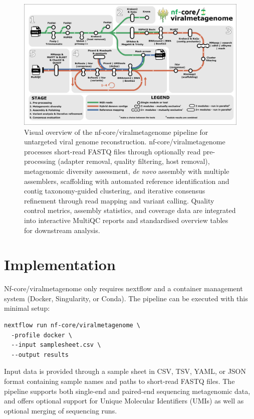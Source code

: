 \begin{figure}[htbp]
    \centering
    \includegraphics[width=1\textwidth]{Fig/fig1.png}
    \caption{Visual overview of the nf-core/viralmetagenome pipeline for untargeted viral genome reconstruction. nf-core/viralmetagenome processes short-read FASTQ files through optionally read pre-processing (adapter removal, quality filtering, host removal), metagenomic diversity assessment, \textit{de novo} assembly with multiple assemblers, scaffolding with automated reference identification and contig taxonomy-guided clustering, and iterative consensus refinement through read mapping and variant calling. Quality control metrics, assembly statistics, and coverage data are integrated into interactive MultiQC reports and standardised overview tables for downstream analysis.}
    \label{fig:pipeline-workflow}
\end{figure}

\section{Implementation}

Nf-core/viralmetagenome only requires nextflow and a container management system (Docker, Singularity, or Conda). The pipeline can be executed with this minimal setup:

\begin{verbatim}
nextflow run nf-core/viralmetagenome \
  -profile docker \
  --input samplesheet.csv \
  --output results
\end{verbatim}

Input data is provided through a sample sheet in CSV, TSV, YAML, or JSON format containing sample names and paths to short-read FASTQ files. The pipeline supports both single-end and paired-end sequencing metagenomic data, and offers optional support for Unique Molecular Identifiers (UMIs) as well as optional merging of sequencing runs.

